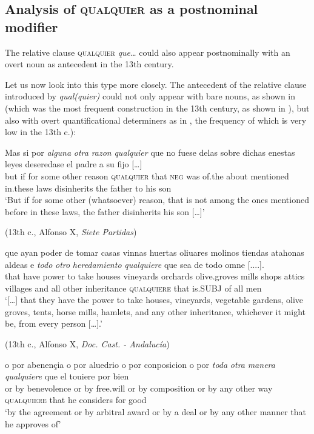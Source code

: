 \subsection{{Analysis} {of} {\textsc{qualquier}} {as} {a} {postnominal} {modifier}} \label{sec:5.3.2}

The relative clause \textsc{qualquier} \textit{que…} could also appear postnominally with an overt noun as antecedent in the 13th century.

Let us now look into this type more closely. The antecedent of the relative clause introduced by \textit{qual(quier)} could not only appear with bare nouns, as shown in  (which was the most frequent construction in the 13th century, as shown in ), but also with overt quantificational determiners as in , the frequency of which is very low in the 13th c.):

\ea \label{ex:key:317} %
\ea  \gll Mas si por \textit{alguna} \textit{otra} \textit{razon} \textit{qualquier} que no fuese delas sobre dichas enestas leyes deseredase el padre a su fijo […]\\
but if for some other reason \textsc{qualquier} that \textsc{neg} was of.the about mentioned in.these laws disinherits the father to his son\\
    \glt ‘But if for some other (whatsoever) reason, that is not among the ones mentioned before in these laws, the father disinherits his son […]’

    (13th c., Alfonso X, \textit{Siete Partidas})
    
\ex{} \gll [...] que ayan poder de tomar casas vinnas huertas oliuares molinos tiendas atahonas aldeas e \textit{todo} \textit{otro} \textit{heredamiento} \textit{qualquiere} que sea de todo omne [....].\\
{} that have power to take houses vineyards orchards olive.groves mills shops attics villages and all other inheritance \textsc{qualquiere} that is.\textsc{SUBJ} of all men\\
    \glt ‘[…] that they have the power to take houses, vineyards, vegetable gardens, olive groves, tents, horse mills, hamlets, and any other inheritance, whichever it might be, from every person […].’

    (13th c., Alfonso X, \textit{Doc. Cast. - Andalucía})
    
\ex \gll o por abenençia o por aluedrio o por conposicion o por \textit{toda} \textit{otra} \textit{manera} \textit{qualquiere} que el touiere por bien\\
or by benevolence or by free.will or by composition or by any other way \textsc{qualquiere} that he considers for good\\
\glt ‘by the agreement or by arbitral award or by a deal or by any other manner that he approves of’

